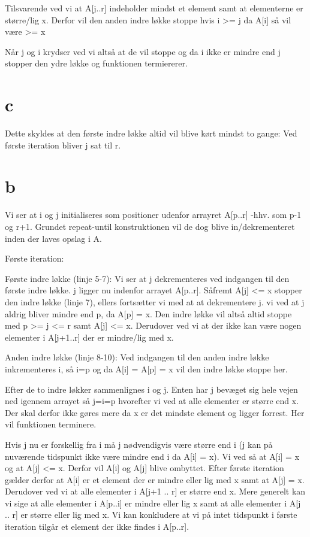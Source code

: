 Tilsvarende ved vi at A[j..r] indeholder mindst et element samt at elementerne er større/lig x. Derfor vil den anden indre løkke stoppe hvis i >= j da A[i] så vil være >= x

Når j og i krydser ved vi altså at de vil stoppe og da i ikke er mindre end j stopper den ydre løkke og funktionen termiererer. 



\section{c}
Dette skyldes at den første indre løkke altid vil blive kørt mindst to gange: Ved første iteration bliver j sat til r. \section{b}
Vi ser at i og j initialiseres som positioner udenfor arrayret A[p..r] -hhv. som p-1 og r+1.
Grundet repeat-until konstruktionen vil de dog blive in/dekrementeret inden der laves opslag i A.

Første iteration:

Første indre løkke (linje 5-7):
Vi ser at j dekrementeres ved indgangen til den første indre løkke. j ligger nu indenfor arrayet A[p..r]. 
Såfremt A[j] <= x stopper den indre løkke (linje 7), ellers fortsætter vi med at at dekrementere j.
vi ved at j aldrig bliver mindre end p, da A[p] = x. Den indre løkke vil altså altid stoppe med p >= j <= r samt A[j] <= x.
Derudover ved vi at der ikke kan være nogen elementer i A[j+1..r] der er mindre/lig med x.
 
Anden indre løkke (linje 8-10):
Ved indgangen til den anden indre løkke inkrementeres i, så i=p og da A[i] = A[p] = x vil den indre løkke stoppe her.

Efter de to indre løkker sammenlignes i og j.
Enten har j bevæget sig hele vejen ned igennem arrayet så j=i=p hvorefter vi ved at alle elementer er større end x. Der skal derfor ikke gøres mere da x er det mindste element og ligger forrest. Her vil funktionen terminere.

Hvis j nu er forskellig fra i må j nødvendigvis være større end i (j kan på nuværende tidspunkt ikke være mindre end i da A[i] = x).
Vi ved så at A[i] = x og at A[j] <= x. Derfor vil A[i] og A[j] blive ombyttet.
Efter første iteration gælder derfor at A[i] er et element der er mindre eller lig med x samt at A[j] = x. Derudover ved vi at alle elementer i A[j+1 .. r] er større end x.
Mere generelt kan vi sige at alle elementer i A[p..i] er mindre eller lig x samt at alle elementer i A[j .. r] er større eller lig med x.
Vi kan konkludere at vi på intet tidspunkt i første iteration tilgår et element der ikke findes i A[p..r].


